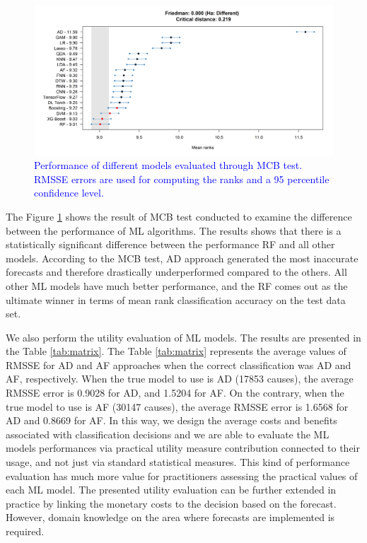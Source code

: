 \documentclass[preprint, 3p,
authoryear]{elsarticle} %
\begin{document}
\begin{figure}[H]

{\centering \includegraphics[width=1\linewidth]{img/300dpi/Fig_MCB_all(review)} 

}

\caption{\textcolor{blue}{Performance of different models evaluated through MCB test. RMSSE errors are used for computing the ranks and a 95 percentile confidence level.}}\label{fig:MCB_ML}
\end{figure}

The Figure \ref{fig:MCB_ML} shows the result of MCB test conducted to
examine the difference between the performance of ML algorithms. The
results shows that there is a statistically significant difference
between the performance RF and all other models. According to the MCB
test, AD approach generated the most inaccurate forecasts and therefore
drastically underperformed compared to the others. All other ML models
have much better performance, and the RF comes out as the ultimate
winner in terms of mean rank classification accuracy on the test data
set.

We also perform the utility evaluation of ML models. The results are
presented in the Table \ref{tab:matrix}. The Table \ref{tab:matrix}
represents the average values of RMSSE for AD and AF approaches when the
correct classification was AD and AF, respectively. When the true model
to use is AD (17853 causes), the average RMSSE error is 0.9028 for AD,
and 1.5204 for AF. On the contrary, when the true model to use is AF
(30147 causes), the average RMSSE error is 1.6568 for AD and 0.8669 for
AF. In this way, we design the average costs and benefits associated
with classification decisions and we are able to evaluate the ML models
performances via practical utility measure contribution connected to
their usage, and not just via standard statistical measures. This kind
of performance evaluation has much more value for practitioners
assessing the practical values of each ML model. The presented utility
evaluation can be further extended in practice by linking the monetary
costs to the decision based on the forecast. However, domain knowledge
on the area where forecasts are implemented is required.
\end{document}
